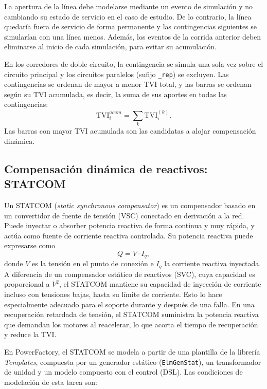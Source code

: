 La apertura de la línea debe modelarse mediante un evento de simulación y no cambiando su estado de servicio en el caso de estudio. De lo contrario, la línea quedaría fuera de servicio de forma permanente y las contingencias siguientes se simularían con una línea menos. Además, los eventos de la corrida anterior deben eliminarse al inicio de cada simulación, para evitar su acumulación.

En los corredores de doble circuito, la contingencia se simula una sola vez sobre el circuito principal y los circuitos paralelos (sufijo \texttt{\_rep}) se excluyen. Las contingencias se ordenan de mayor a menor TVI total, y las barras se ordenan según su TVI acumulada, es decir, la suma de sus aportes en todas las contingencias:
\begin{equation}
    \mathrm{TVI}_i^{acum} = \sum_{k} \mathrm{TVI}_i^{(k)}.
\end{equation}
Las barras con mayor TVI acumulada son las candidatas a alojar compensación dinámica.

\subsection{Compensación dinámica de reactivos: STATCOM}

Un STATCOM (\textit{static synchronous compensator}) es un compensador basado en un convertidor de fuente de tensión (VSC) conectado en derivación a la red. Puede inyectar o absorber potencia reactiva de forma continua y muy rápida, y actúa como fuente de corriente reactiva controlada. Su potencia reactiva puede expresarse como
\begin{equation}
    Q = V \cdot I_q,
\end{equation}
donde $V$ es la tensión en el punto de conexión e $I_q$ la corriente reactiva inyectada. A diferencia de un compensador estático de reactivos (SVC), cuya capacidad es proporcional a $V^2$, el STATCOM mantiene su capacidad de inyección de corriente incluso con tensiones bajas, hasta su límite de corriente. Esto lo hace especialmente adecuado para el soporte durante y después de una falla. En una recuperación retardada de tensión, el STATCOM suministra la potencia reactiva que demandan los motores al reacelerar, lo que acorta el tiempo de recuperación y reduce la TVI.

En PowerFactory, el STATCOM se modela a partir de una plantilla de la librería \textit{Templates}, compuesta por un generador estático (\texttt{ElmGenStat}), un transformador de unidad y un modelo compuesto con el control (DSL). Las condiciones de modelación de esta tarea son:

